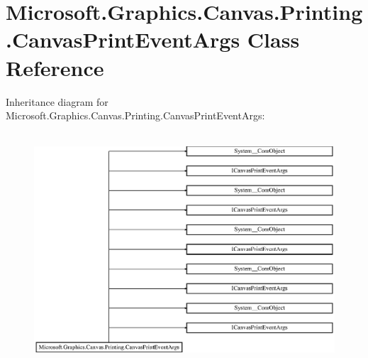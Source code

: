 \hypertarget{class_microsoft_1_1_graphics_1_1_canvas_1_1_printing_1_1_canvas_print_event_args}{}\section{Microsoft.\+Graphics.\+Canvas.\+Printing.\+Canvas\+Print\+Event\+Args Class Reference}
\label{class_microsoft_1_1_graphics_1_1_canvas_1_1_printing_1_1_canvas_print_event_args}
Inheritance diagram for Microsoft.\+Graphics.\+Canvas.\+Printing.\+Canvas\+Print\+Event\+Args\+:\begin{figure}[H]
\begin{center}
\leavevmode
\includegraphics[height=8.700564cm]{class_microsoft_1_1_graphics_1_1_canvas_1_1_printing_1_1_canvas_print_event_args}
\end{center}
\end{figure}
